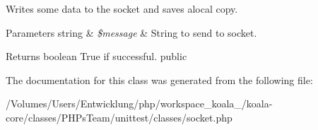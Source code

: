 \label{class_simple_socket_a0c8a3adc1d670b4af4caf7f3f5a054b9}
Writes some data to the socket and saves alocal copy. 
\begin{DoxyParams}[1]{Parameters}
string & {\em \$message} & String to send to socket. \\
\hline
\end{DoxyParams}
\begin{DoxyReturn}{Returns}
boolean True if successful.  public 
\end{DoxyReturn}


The documentation for this class was generated from the following file:\begin{DoxyCompactItemize}
\item 
/Volumes/Users/Entwicklung/php/workspace\_\-koala\_/koala-\/core/classes/PHPsTeam/unittest/classes/socket.php\end{DoxyCompactItemize}
